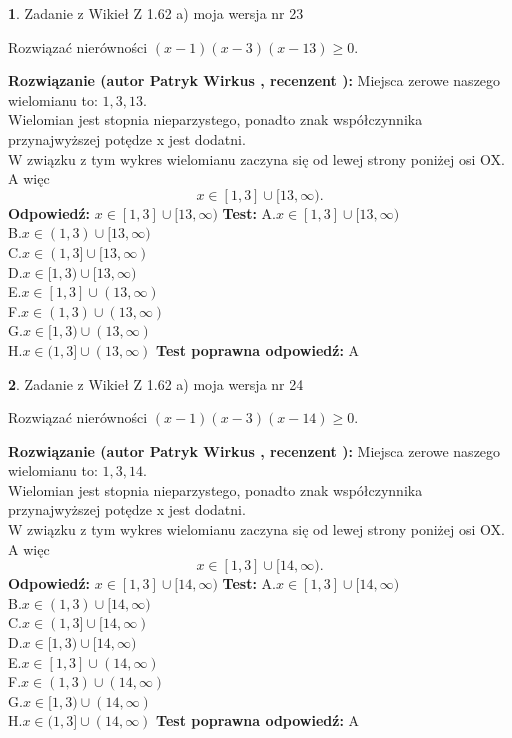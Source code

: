 \documentclass[12pt, a4paper]{article}
\theoremstyle{definition} %
\newtheorem{zad}{}
\newcommand{\zadStart}[1]{\begin{zad}#1\newline}
\newcommand{\zadStop}{\end{zad}}
\newcommand{\rozwStart}[2]{\noindent \textbf{Rozwiązanie (autor #1 , recenzent #2): }\newline}
\newcommand{\rozwStop}{\newline}
\newcommand{\odpStart}{\noindent \textbf{Odpowiedź:}\newline}
\newcommand{\odpStop}{\newline}
\newcommand{\testStart}{\noindent \textbf{Test:}\newline}
\newcommand{\testStop}{\newline}
\newcommand{\kluczStart}{\noindent \textbf{Test poprawna odpowiedź:}\newline}
\newcommand{\kluczStop}{\newline}
\begin{document}
\zadStart{Zadanie z Wikieł Z 1.62 a) moja wersja nr 23}

Rozwiązać nierówności $(x-1)(x-3)(x-13)\ge0$.
\zadStop
\rozwStart{Patryk Wirkus}{}
Miejsca zerowe naszego wielomianu to: $1, 3, 13$.\\
Wielomian jest stopnia nieparzystego, ponadto znak współczynnika przy\linebreak najwyższej potędze x jest dodatni.\\ W związku z tym wykres wielomianu zaczyna się od lewej strony poniżej osi OX. A więc $$x \in [1,3] \cup [13,\infty).$$
\rozwStop
\odpStart
$x \in [1,3] \cup [13,\infty)$
\odpStop
\testStart
A.$x \in [1,3] \cup [13,\infty)$\\
B.$x \in (1,3) \cup [13,\infty)$\\
C.$x \in (1,3] \cup [13,\infty)$\\
D.$x \in [1,3) \cup [13,\infty)$\\
E.$x \in [1,3] \cup (13,\infty)$\\
F.$x \in (1,3) \cup (13,\infty)$\\
G.$x \in [1,3) \cup (13,\infty)$\\
H.$x \in (1,3] \cup (13,\infty)$
\testStop
\kluczStart
A
\kluczStop



\zadStart{Zadanie z Wikieł Z 1.62 a) moja wersja nr 24}

Rozwiązać nierówności $(x-1)(x-3)(x-14)\ge0$.
\zadStop
\rozwStart{Patryk Wirkus}{}
Miejsca zerowe naszego wielomianu to: $1, 3, 14$.\\
Wielomian jest stopnia nieparzystego, ponadto znak współczynnika przy\linebreak najwyższej potędze x jest dodatni.\\ W związku z tym wykres wielomianu zaczyna się od lewej strony poniżej osi OX. A więc $$x \in [1,3] \cup [14,\infty).$$
\rozwStop
\odpStart
$x \in [1,3] \cup [14,\infty)$
\odpStop
\testStart
A.$x \in [1,3] \cup [14,\infty)$\\
B.$x \in (1,3) \cup [14,\infty)$\\
C.$x \in (1,3] \cup [14,\infty)$\\
D.$x \in [1,3) \cup [14,\infty)$\\
E.$x \in [1,3] \cup (14,\infty)$\\
F.$x \in (1,3) \cup (14,\infty)$\\
G.$x \in [1,3) \cup (14,\infty)$\\
H.$x \in (1,3] \cup (14,\infty)$
\testStop
\kluczStart
A
\kluczStop
\end{document}
